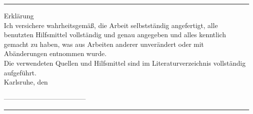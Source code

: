 
\vspace*{3cm}
\begin{center}
\begin{minipage}[c]{0.75\textwidth}
\rule{\textwidth}{0.5pt}

Erklärung\\[1cm]
Ich versichere wahrheitsgemäß, die Arbeit selbstständig angefertigt,
alle benutzten Hilfsmittel vollständig und genau angegeben und alles
kenntlich gemacht zu haben, was aus Arbeiten anderer unverändert oder
mit Abänderungen entnommen wurde.
\\[0.5cm]
Die verwendeten Quellen und Hilfsmittel sind im Literaturverzeichnis 
vollständig aufgeführt.\\[1cm]

Karlsruhe, den \finishdate\\[1cm]



\hfill
\begin{minipage}{0.45\linewidth}
------------------------------------\\
\student{}
\end{minipage}



\rule{\textwidth}{0.5pt}
\end{minipage}
\end{center}

